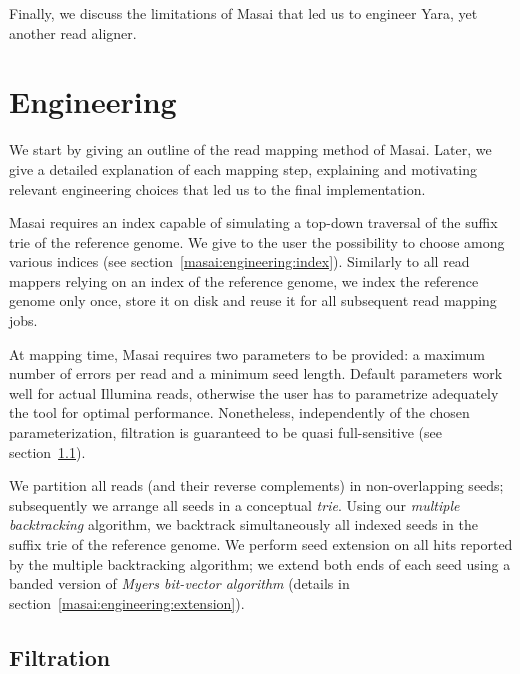 Finally, we discuss the limitations of Masai that led us to engineer Yara, yet another read aligner.


\section{Engineering}

We start by giving an outline of the read mapping method of Masai.
Later, we give a detailed explanation of each mapping step, explaining and motivating relevant engineering choices that led us to the final implementation.

Masai requires an index capable of simulating a top-down traversal of the suffix trie of the reference genome.
We give to the user the possibility to choose among various indices (see section~\ref{masai:engineering:index}).
Similarly to all read mappers relying on an index of the reference genome, we index the reference genome only once, store it on disk and reuse it for all subsequent read mapping jobs.

At mapping time, Masai requires two parameters to be provided: a maximum number of errors per read and a minimum seed length.
Default parameters work well for actual Illumina reads, otherwise the user has to parametrize adequately the tool for optimal performance.
Nonetheless, independently of the chosen parameterization, filtration is guaranteed to be quasi full-sensitive (see section~\ref{masai:engineering:seeding}).

We partition all reads (and their reverse complements) in non-overlapping seeds;
subsequently we arrange all seeds in a conceptual \emph{trie}.
Using our \emph{multiple backtracking} algorithm, we backtrack simultaneously all indexed seeds in the suffix trie of the reference genome.
We perform seed extension on all hits reported by the multiple backtracking algorithm;
we extend both ends of each seed using a banded version of \emph{Myers bit-vector algorithm} \citep{Myers1999} (details in section~\ref{masai:engineering:extension}).


\subsection{Filtration}
\label{masai:engineering:seeding}

